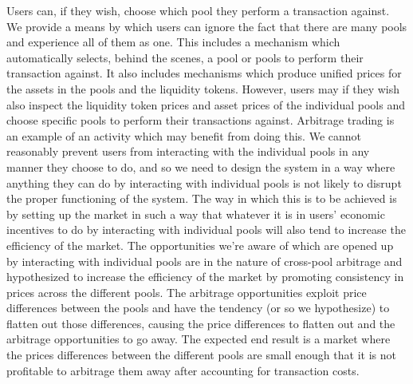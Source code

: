 \documentclass[12pt]{article}
\begin{document}
Users can, if they wish, choose which pool they perform a transaction against. We provide a means by
which users can ignore the fact that there are many pools and experience all of them as one.
This includes a mechanism which automatically selects, behind the scenes, a pool or pools to perform
their transaction against. It also includes mechanisms which produce unified prices for the assets
in the pools and the liquidity tokens. However, users may if they wish also inspect the liquidity
token prices and asset prices of the individual pools and choose specific pools to perform their
transactions against. Arbitrage trading is an example of an activity which may benefit from doing this.
We cannot reasonably prevent users from interacting with the individual pools in any manner they choose
to do, and so we need to design the system in a way where anything they can do by interacting
with individual pools is not likely to disrupt the proper functioning of the system. The way in which
this is to be achieved is by setting up the market in such a way that whatever it is in users' economic
incentives to do by interacting with individual pools will also tend to increase the efficiency
of the market. The opportunities we're aware of which are opened up by interacting with individual
pools are in the nature of cross-pool arbitrage and hypothesized to increase the efficiency of the
market by promoting consistency in prices across the different pools. The arbitrage opportunities
exploit price differences between the pools and have the tendency (or so we hypothesize)
to flatten out those differences, causing the price differences to flatten out and the arbitrage
opportunities to go away. The expected end result is a market where the prices differences
between the different pools are small enough that it is not profitable to arbitrage them
away after accounting for transaction costs.
\end{document}
